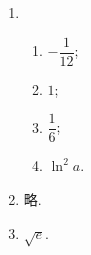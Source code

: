 \documentclass[a4paper, 11pt]{ctexart}
\begin{document}
\pagestyle{empty}
\begin{enumerate}
    \item %
        \begin{enumerate}[(1)]
            \item %
                $-\dfrac{1}{12}$;
            \item %
                $1$;
            \item %
                $\dfrac16$;
            \item %
                $\ln^2a$.
        \end{enumerate}
    \item %
        略.
    \item %
        $\sqrt{e}$.
\end{enumerate}
\end{document}
